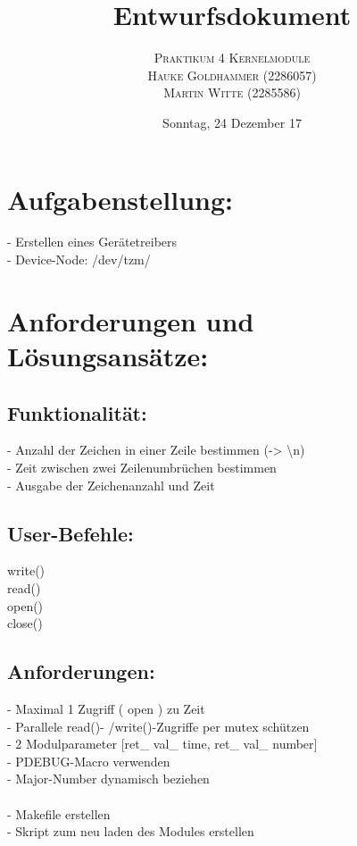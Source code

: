 \documentclass[paper=a4, fontsize=12pt]{article}
\title{\vspace{-15mm}\fontsize{24pt}{10pt}\selectfont\textbf{Entwurfsdokument}} %
\author{
    \large
    {\textsc{Praktikum 4 Kernelmodule}}\\[2mm]
    {\textsc{Hauke Goldhammer (2286057)}}\\[2mm]
    {\textsc{Martin Witte (2285586)}}\\[2mm]
}
\date{Sonntag, 24 Dezember 17} %
\begin{document}
\maketitle %
\thispagestyle{fancy} %

\section{Aufgabenstellung:}
- Erstellen eines Gerätetreibers\\
- Device-Node: /dev/tzm/\\


\section{Anforderungen und Lösungsansätze:}

\subsection{Funktionalität:}
- Anzahl der Zeichen in einer Zeile bestimmen (-> \textbackslash n)\\
- Zeit zwischen zwei Zeilenumbrüchen bestimmen\\
- Ausgabe der Zeichenanzahl und Zeit

\subsection{User-Befehle:}
write() \\
read() \\
open() \\
close() \\

\subsection{Anforderungen:}
- Maximal 1 Zugriff ( open ) zu Zeit \\
- Parallele read()- /write()-Zugriffe per mutex schützen \\
- 2 Modulparameter [ret\_ val\_ time, ret\_ val\_ number] \\
- PDEBUG-Macro verwenden \\
- Major-Number dynamisch beziehen \\
\\
- Makefile erstellen \\
- Skript zum neu laden des Modules erstellen \\
\newpage
\end{document}
